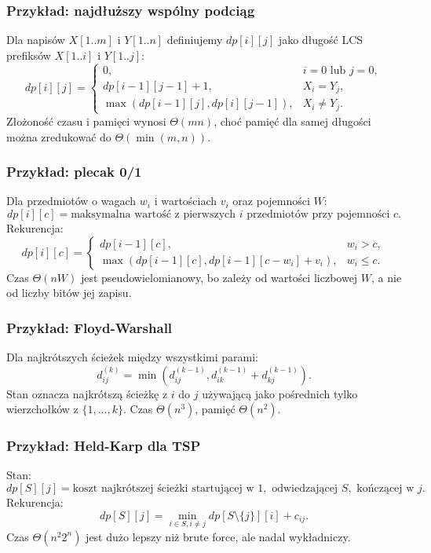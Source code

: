 \subsubsection{Przykład: najdłuższy wspólny podciąg}

Dla napisów $X[1..m]$ i $Y[1..n]$ definiujemy $dp[i][j]$ jako długość LCS prefiksów $X[1..i]$ i $Y[1..j]$:
\[
dp[i][j]=
\begin{cases}
0, & i=0\text{ lub }j=0,\\
dp[i-1][j-1]+1, & X_i=Y_j,\\
\max(dp[i-1][j],dp[i][j-1]), & X_i\ne Y_j.
\end{cases}
\]
Złożoność czasu i pamięci wynosi $\Theta(mn)$, choć pamięć dla samej długości można zredukować do $\Theta(\min(m,n))$.

\subsubsection{Przykład: plecak 0/1}

Dla przedmiotów o wagach $w_i$ i wartościach $v_i$ oraz pojemności $W$:
\[
dp[i][c]=\text{maksymalna wartość z pierwszych }i\text{ przedmiotów przy pojemności }c.
\]
Rekurencja:
\[
dp[i][c]=
\begin{cases}
dp[i-1][c], & w_i>c,\\
\max(dp[i-1][c],dp[i-1][c-w_i]+v_i), & w_i\le c.
\end{cases}
\]
Czas $\Theta(nW)$ jest pseudowielomianowy, bo zależy od wartości liczbowej $W$, a nie od liczby bitów jej zapisu.

\subsubsection{Przykład: Floyd-Warshall}

Dla najkrótszych ścieżek między wszystkimi parami:
\[
d^{(k)}_{ij}=\min\left(d^{(k-1)}_{ij},d^{(k-1)}_{ik}+d^{(k-1)}_{kj}\right).
\]
Stan oznacza najkrótszą ścieżkę z $i$ do $j$ używającą jako pośrednich tylko wierzchołków z $\{1,\dots,k\}$. Czas $\Theta(n^3)$, pamięć $\Theta(n^2)$.

\subsubsection{Przykład: Held-Karp dla TSP}

Stan:
\[
dp[S][j]=\text{koszt najkrótszej ścieżki startującej w }1,\text{ odwiedzającej }S,\text{ kończącej w }j.
\]
Rekurencja:
\[
dp[S][j]=\min_{i\in S, i\ne j} dp[S\setminus\{j\}][i]+c_{ij}.
\]
Czas $\Theta(n^2 2^n)$ jest dużo lepszy niż brute force, ale nadal wykładniczy.

